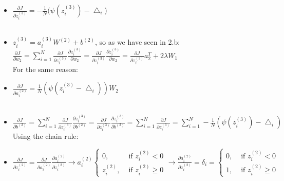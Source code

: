 \documentclass[
	12pt, %
]{fphw}
\begin{document}
\begin{itemize}

\item $\frac{\partial J}{\partial z_{i}^{(3)}} = - \frac{1}{N} (\psi (z_{i}^{(3)}) - \bigtriangleup_i$) \\ \\

\item $z_{i}^{(3)} = a_{i}^{(3)} W^{(2)} + b^{(2)}$, so as we have seen in 2.b: \\ 

$\frac{\partial{J}}{\partial {w_2}} = \sum_{i=1}^N \frac{\partial{J}}{\partial z_{i}^{(3)}}\frac{\partial z_{i}^{(3)}}{\partial {w_2}}
= \frac{\partial{J}}{\partial z_{i}^{(3)}}\frac{\partial z_{i}^{(3)}}{\partial {w_2}}
= \frac{\partial{J}}{\partial z_{i}^{(3)}}{a_2^T}+2\lambda W_1$\\

For the same reason:

\item $\frac {\partial J}{\partial a_{i}^{(2)}} = \frac{1}{N} (\psi (z_{i}^{(3)} - \bigtriangleup_i)) W_2$ \\	\\

\item $\frac{\partial{J}}{\partial {b^{(2)}}} = \sum_{i=1}^N \frac{\partial{J}}{\partial z_{i}^{(3)}}\frac{\partial z_{i}^{(3)}}{\partial {b^{(2)}}}
= \frac{\partial{J}}{\partial z_{i}^{(3)}}\frac{\partial z_{i}^{(3)}}{\partial {b^{(2)}}}
= \sum_{i=1}^N\frac{\partial{J}}{\partial z_{i}^{(3)}} = \sum_{i = 1}^N - \frac{1}{N} (\psi (z_{i}^{(3)}) - \bigtriangleup_i) $\\

Using the chain rule:

\item $\frac {\partial J}{\partial z_{i}^{(2)}} = \frac {\partial J}{\partial a_{i}^{(2)}} \frac {\partial a_{i}^{(2)}}{\partial z_{i}^{(2)}} \rightarrow a_{i}^{(2)}\left\{\begin{array}{ll}
0, & \text { if } z_{i}^{(2)}<0 \\
z_{i}^{(2)}, & \text { if } z_{i}^{(2)}\geq0
\end{array}\right.
\rightarrow \frac {\partial a_{i}^{(2)}}{\partial z_{i}^{(2)}} = \delta_i = 
\left\{\begin{array}{ll}
0, & \text { if } z_{i}^{(2)}<0 \\
1, & \text { if } z_{i}^{(2)}\geq0
\end{array}\right.
$ \\


\end{itemize}
\end{document}
